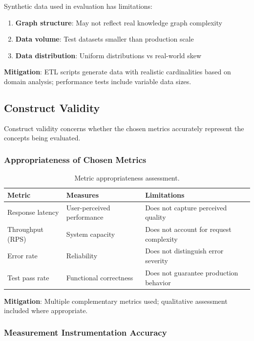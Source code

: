 Synthetic data used in evaluation has limitations:

\begin{enumerate}
    \item \textbf{Graph structure}: May not reflect real knowledge graph complexity
    \item \textbf{Data volume}: Test datasets smaller than production scale
    \item \textbf{Data distribution}: Uniform distributions vs real-world skew
\end{enumerate}

\textbf{Mitigation}: ETL scripts generate data with realistic cardinalities based on domain analysis; performance tests include variable data sizes.

\subsection{Construct Validity}

Construct validity concerns whether the chosen metrics accurately represent the concepts being evaluated.

\subsubsection{Appropriateness of Chosen Metrics}

\begin{table}[ht]
\centering
\caption{Metric appropriateness assessment.}
\label{tab:metric-appropriateness}
\small
\begin{tabular}{p{3cm}p{4cm}p{5cm}}
\hline
\textbf{Metric} & \textbf{Measures} & \textbf{Limitations} \\
\hline
Response latency & User-perceived performance & Does not capture perceived quality \\
Throughput (RPS) & System capacity & Does not account for request complexity \\
Error rate & Reliability & Does not distinguish error severity \\
Test pass rate & Functional correctness & Does not guarantee production behavior \\
\hline
\end{tabular}
\end{table}

\textbf{Mitigation}: Multiple complementary metrics used; qualitative assessment included where appropriate.

\subsubsection{Measurement Instrumentation Accuracy}


